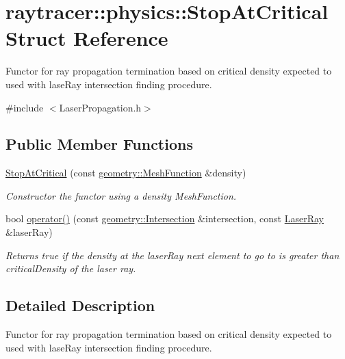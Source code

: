 \hypertarget{structraytracer_1_1physics_1_1StopAtCritical}{}\section{raytracer\+:\+:physics\+:\+:Stop\+At\+Critical Struct Reference}
\label{structraytracer_1_1physics_1_1StopAtCritical}


Functor for ray propagation termination based on critical density expected to used with lase\+Ray intersection finding procedure.  




{\ttfamily \#include $<$Laser\+Propagation.\+h$>$}

\subsection*{Public Member Functions}
\begin{DoxyCompactItemize}
\item 
\hyperlink{structraytracer_1_1physics_1_1StopAtCritical_adf3b3635cbe76fb2f9a079c27e31f430}{Stop\+At\+Critical} (const \hyperlink{classraytracer_1_1geometry_1_1MeshFunction}{geometry\+::\+Mesh\+Function} \&density)
\begin{DoxyCompactList}\small\item\em Constructor the functor using a density Mesh\+Function. \end{DoxyCompactList}\item 
bool \hyperlink{structraytracer_1_1physics_1_1StopAtCritical_a54e6eb47a50e7448e997444647a900be}{operator()} (const \hyperlink{structraytracer_1_1geometry_1_1Intersection}{geometry\+::\+Intersection} \&intersection, const \hyperlink{structraytracer_1_1physics_1_1LaserRay}{Laser\+Ray} \&laser\+Ray)
\begin{DoxyCompactList}\small\item\em Returns true if the density at the laser\+Ray next element to go to is greater than critical\+Density of the laser ray. \end{DoxyCompactList}\end{DoxyCompactItemize}


\subsection{Detailed Description}
Functor for ray propagation termination based on critical density expected to used with lase\+Ray intersection finding procedure. 

